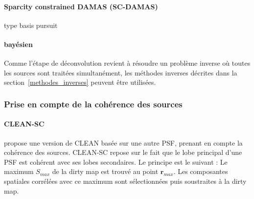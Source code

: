  







\paragraph{Sparcity constrained DAMAS (SC-DAMAS)}
\cite{Yardibi2008}

type basis pursuit

\paragraph{bayésien}


Comme l'étape de déconvolution revient à résoudre un problème inverse où toutes les sources sont traitées simultanément, les méthodes inverses décrites dans la section~\ref{methodes_inverses} peuvent être utilisées.


\subsubsection{Prise en compte de la cohérence des sources}
\paragraph{CLEAN-SC}
\cite{Sijtsma2007} propose une version de CLEAN basée sur une autre PSF, prenant en compte la cohérence des sources. CLEAN-SC repose sur le fait que le lobe principal d'une PSF est cohérent avec ses lobes secondaires. Le principe est le suivant : Le maximum  $S_{max}$ de la dirty map est trouvé au point $\bm{r}_{max}$.  Les composantes spatiales corrélées avec ce maximum sont sélectionnées puis soustraites à la dirty map.\\

